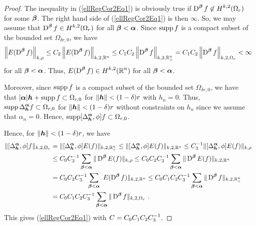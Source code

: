 \begin{proof}
The inequality in (\ref{ellRegCor2Eq1}) is obviously true if
$\displaystyle \operatorname{D}^{{\bm{\beta}}} f \not\in H^{k,2}(\Omega_r)$ for some
${\bm{\beta}}$.  The right hand side of (\ref{ellRegCor2Eq1}) is then
$\infty$.  So, we may assume that
$\displaystyle \operatorname{D}^{{\bm{\beta}}} f \in H^{k,2}(\Omega_r)$ for all
${\bm{\beta}} < {\bm{\alpha}}$.
Since $\operatorname{supp} f$ is a compact subset of the bounded set
$\Omega_{\delta r,0}$,
we have
\[
\left\|E(\operatorname{D}^{{\bm{\beta}}} f)\right\|_{k,\rho}
\leq C_2 \left\|E(\operatorname{D}^{{\bm{\beta}}} f)\right\|_{k,2,\mathbb{R}^n}
\leq C_1 C_2 \left\|\operatorname{D}^{{\bm{\beta}}} f\right\|_{k,2,\mathbb{R}^n_+}
= C_1 C_2 \left\|\operatorname{D}^{{\bm{\beta}}} f\right\|_{k,2,\Omega_r}
< \infty
\]
for all ${\bm{\beta}} < {\bm{\alpha}}$.  Thus,
$\displaystyle E(\operatorname{D}^{{\bm{\beta}}} f) \in H^{k,2}(\mathbb{R}^n)$
for all ${\bm{\beta}} < {\bm{\alpha}}$.

Moreover, since $\operatorname{supp} f$ is a compact subset of the bounded set
$\Omega_{\delta r,0}$, we have that
$|{\bm{\alpha}}| {\bm{h}} + \operatorname{supp} f \subset \Omega_{r,0}$
for $\|{\bm{h}}\| < (1-\delta)r$ with $h_n = 0$.    Thus,
$\displaystyle \operatorname{supp} \Delta^{{\bm{\alpha}}}_{{\bm{h}}} f \subset \Omega_{r,0}$ for
$\|{\bm{h}}\| < (1-\delta)r$ without constraints on $h_n$ since we assume
that $\alpha_n = 0$.  Hence,
$\displaystyle \operatorname{supp} [\Delta^{{\bm{\alpha}}}_{{\bm{h}}}, \phi] f
\subset \Omega_{r,0}$.

Hence, for $\|{\bm{h}}\| < (1-\delta)r$, we have
\begin{align*}
\| [\Delta^{{\bm{\alpha}}}_{{\bm{h}}}, \phi] f \|_{k,2,\Omega_r}
&= \| [\Delta^{{\bm{\alpha}}}_{{\bm{h}}}, \phi] E(f) \|_{k,2,\mathbb{R}^n_+}
\leq \| [\Delta^{{\bm{\alpha}}}_{{\bm{h}}}, \phi] E(f) \|_{k,2,\mathbb{R}^n}
\leq C_3^{-1} \| [\Delta^{{\bm{\alpha}}}_{{\bm{h}}}, \phi] E(f) \|_{k,\rho} \\
& \leq C_0 C_3^{-1} \sum_{{\bm{\beta}}<{\bm{\alpha}}}
\| \operatorname{D}^{{\bm{\beta}}} E(f) \|_{k,\rho}
\leq C_0 C_2 C_3^{-1} \sum_{{\bm{\beta}}<{\bm{\alpha}}} \|
\operatorname{D}^{{\bm{\beta}}} E(f)  \|_{k,2,\mathbb{R}^n} \\
&= C_0 C_2 C_3^{-1} \sum_{{\bm{\beta}}<{\bm{\alpha}}} \
E(\operatorname{D}^{{\bm{\beta}}} f) \|_{k,2,\mathbb{R}^n}
\leq C_0 C_1 C_2 C_3^{-1}
\sum_{{\bm{\beta}}<{\bm{\alpha}}} \| \operatorname{D}^{{\bm{\beta}}} f \|_{k,2,\mathbb{R}^n_+} \\
&=  C_0 C_1 C_2 C_3^{-1} \sum_{{\bm{\beta}}<{\bm{\alpha}}}
\| \operatorname{D}^{{\bm{\beta}}} f \|_{k,2,\Omega_r} \ .
\end{align*}
This gives (\ref{ellRegCor2Eq1}) with $\displaystyle C = C_0 C_1 C_2 C_3^{-1}$.
\end{proof}

